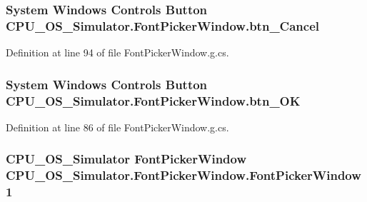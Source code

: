 \subsubsection[{btn\+\_\+\+Cancel}]{\setlength{\rightskip}{0pt plus 5cm}System Windows Controls Button C\+P\+U\+\_\+\+O\+S\+\_\+\+Simulator.\+Font\+Picker\+Window.\+btn\+\_\+\+Cancel\hspace{0.3cm}{\ttfamily [package]}}\label{class_c_p_u___o_s___simulator_1_1_font_picker_window_ad6c32f2add6a3395a8e798bdcdfbaa2c}


Definition at line 94 of file Font\+Picker\+Window.\+g.\+cs.

\hypertarget{class_c_p_u___o_s___simulator_1_1_font_picker_window_a7fda867379bdd5f59a54822628d80aca}{}
\subsubsection[{btn\+\_\+\+O\+K}]{\setlength{\rightskip}{0pt plus 5cm}System Windows Controls Button C\+P\+U\+\_\+\+O\+S\+\_\+\+Simulator.\+Font\+Picker\+Window.\+btn\+\_\+\+O\+K\hspace{0.3cm}{\ttfamily [package]}}\label{class_c_p_u___o_s___simulator_1_1_font_picker_window_a7fda867379bdd5f59a54822628d80aca}


Definition at line 86 of file Font\+Picker\+Window.\+g.\+cs.

\hypertarget{class_c_p_u___o_s___simulator_1_1_font_picker_window_afb8444d85c5401e08689ca4ad477703a}{}
\subsubsection[{Font\+Picker\+Window1}]{\setlength{\rightskip}{0pt plus 5cm}C\+P\+U\+\_\+\+O\+S\+\_\+\+Simulator {\bf Font\+Picker\+Window} C\+P\+U\+\_\+\+O\+S\+\_\+\+Simulator.\+Font\+Picker\+Window.\+Font\+Picker\+Window1\hspace{0.3cm}{\ttfamily [package]}}\label{class_c_p_u___o_s___simulator_1_1_font_picker_window_afb8444d85c5401e08689ca4ad477703a}


